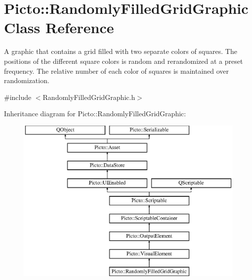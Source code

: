 \hypertarget{class_picto_1_1_randomly_filled_grid_graphic}{\section{Picto\-:\-:Randomly\-Filled\-Grid\-Graphic Class Reference}
\label{class_picto_1_1_randomly_filled_grid_graphic}
}


A graphic that contains a grid filled with two separate colors of squares. The positions of the different square colors is random and rerandomized at a preset frequency. The relative number of each color of squares is maintained over randomization.  




{\ttfamily \#include $<$Randomly\-Filled\-Grid\-Graphic.\-h$>$}

Inheritance diagram for Picto\-:\-:Randomly\-Filled\-Grid\-Graphic\-:\begin{figure}[H]
\begin{center}
\leavevmode
\includegraphics[height=8.038278cm]{class_picto_1_1_randomly_filled_grid_graphic}
\end{center}
\end{figure}
